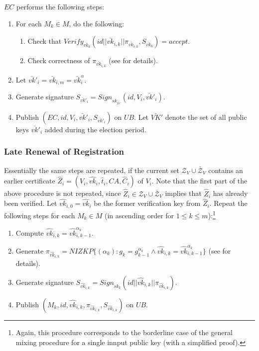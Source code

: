 \documentclass[bibtotoc,halfparskip,oneside]{scrreprt}
\newcommand{\eid}{\mathit{id}\xspace}
\newcommand{\sk}[1]{\mathit{sk}_{#1}\xspace}
\newcommand{\vk}[1]{\mathit{vk}_{#1}\xspace}
\newcommand{\vkbar}[1]{\bar{\mathit{vk}}_{#1}\xspace}
\newcommand{\vkbarprime}[1]{\bar{\mathit{vk}}'_{#1}\xspace}
\newcommand{\vkhat}[1]{\hat{\mathit{vk}}_{#1}\xspace}
\newcommand{\SK}[1]{\sk{_#1}\xspace}
\newcommand{\CA}{\ensuremath{\mathit{CA}}\xspace}
\newcommand{\EC}{\ensuremath{\mathit{EC}}\xspace}
\newcommand{\UB}{\ensuremath{\mathit{UB}}\xspace}
\newcommand{\Mixer}[1]{\ensuremath{\mathit{M}_{#1}}\xspace}
\newcommand{\Voter}[1]{\ensuremath{\mathit{V}_{#1}}\xspace}
\begin{document}
\EC performs the following steps:
\begin{enumerate}[resume]
	\item For each $\Mixer{k}\in M$, do the following:
	\begin{enumerate}
		\item Check that $\mathit{Verify}_{\vk{k}}(\eid||\vkbar{i,k}||\pi_{\vkbar{i,k}},S_{\vkbar{k}})=\mathit{accept}$.
		\item Check correctness of $\pi_{\vkbar{i,k}}$ (see  for details).
	\end{enumerate}
	\item Let $\vkbarprime{i}=\vkbar{i,m}=\vkbar{i}^{\alpha}$.
	\item Generate signature $S_{\vkbarprime{i}}=\mathit{Sign}_{\SK{\EC}}(\eid,\Voter{i},\vkbarprime{i})$.
	\item Publish $(\EC,\eid,\Voter{i},\vkbarprime{i},S_{\vkbarprime{i}})$ on \UB. Let $\bar{\mathit{VK}}'$ denote the set of all public keys $\vkbarprime{i}$ added during the election period.
\end{enumerate}

\subsubsection{Late Renewal of Registration}

Essentially the same steps are repeated, if the current set $\mathcal{Z}_V \cup \bar{\mathcal{Z}}_V$ contains an earlier certificate $\hat{Z}_i=(\Voter{i},\vkhat{i},\hat{t}_i,\CA,\hat{C}_i)$ of $\Voter{i}$. Note that the first part of the above procedure is not repeated, since $\hat{Z}_i\in\mathcal{Z}_V \cup \bar{\mathcal{Z}}_V$ implies that $\hat{Z}_i$ has already been verified. Let $\vkhat{i,0}=\vkhat{i}$ be the former verification key from $\hat{Z}_i$. Repeat the following steps for each $\Mixer{k}\in M$ (in ascending order for $1\leq k\leq m$):\footnote{Again, this procedure corresponds to the borderline case of the general mixing procedure for a single innput public key (with a simplified proof).}

\begin{enumerate}
	\item Compute $\vkhat{i,k}=\vkhat{i,k-1}^{\alpha_k}$.
\	\item Generate $\pi_{\vkhat{i,k}}=\mathit{NIZKP}\{(\alpha_k):g_k=g_{k-1}^{\alpha_k}\wedge\vkhat{i,k}=\vkhat{i,k-1}^{\alpha_k}\}$ (see  for details).
	\item Generate signature $S_{\vkhat{i,k}}=\mathit{Sign}_{\sk{k}}(\eid||\vkhat{i,k}||\pi_{\vkhat{i,k}})$.
	\item Publish $(\Mixer{k},\eid,\vkhat{i,k},\pi_{\vkhat{i,k}},S_{\vkhat{i,k}})$ on \UB.
\end{enumerate}
\end{document}
